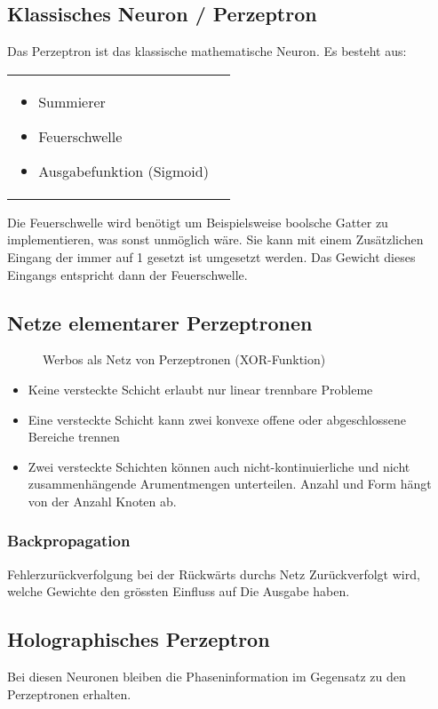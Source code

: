 \subsection{Klassisches Neuron / Perzeptron}
Das Perzeptron ist das klassische mathematische Neuron. Es besteht aus:\\
\begin{tabularx}{\textwidth}{XX}
	\vspace{-1.5cm}
	\begin{itemize}
		\item Summierer
		\item Feuerschwelle
		\item Ausgabefunktion (Sigmoid)
	\end{itemize} &
	
\end{tabularx}

Die Feuerschwelle wird benötigt um Beispielsweise boolsche Gatter zu
implementieren, was sonst unmöglich wäre.  Sie kann mit einem Zusätzlichen
Eingang der immer auf 1 gesetzt ist umgesetzt werden.  Das Gewicht dieses
Eingangs entspricht dann der Feuerschwelle.

\subsection{Netze elementarer Perzeptronen}
\begin{figure}[h!]
	\centering
	
	\caption{Werbos als Netz von Perzeptronen (XOR-Funktion)}
\end{figure}
\begin{itemize}
	\item Keine versteckte Schicht erlaubt nur linear trennbare Probleme
	\item Eine versteckte Schicht kann zwei konvexe offene oder abgeschlossene Bereiche trennen
	\item Zwei versteckte Schichten können auch nicht-kontinuierliche und nicht zusammenhängende
		Arumentmengen unterteilen. Anzahl und Form hängt von der Anzahl Knoten ab.
\end{itemize}

\subsubsection{Backpropagation}
Fehlerzurückverfolgung bei der Rückwärts durchs Netz Zurückverfolgt wird,
welche Gewichte den grössten Einfluss auf Die Ausgabe haben.

\subsection{Holographisches Perzeptron}
Bei diesen Neuronen bleiben die Phaseninformation im Gegensatz zu den
Perzeptronen erhalten.

